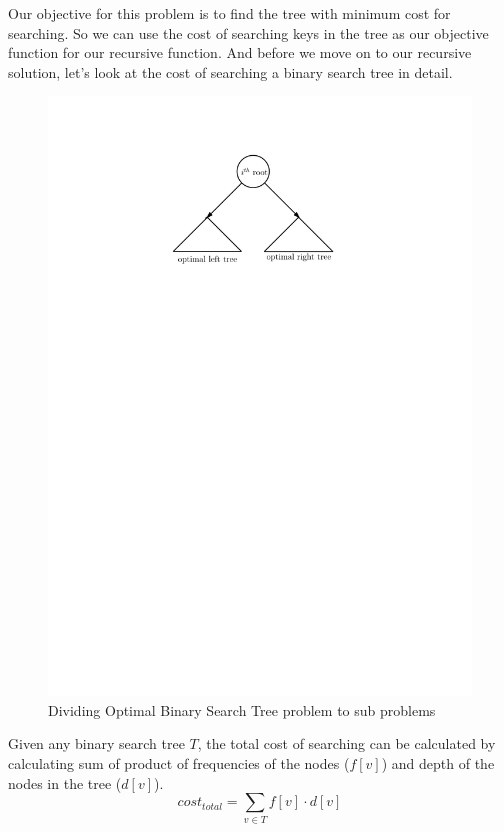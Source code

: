 \documentclass[11pt]{article}
\theoremstyle{definition}
\begin{document}
    Our objective for this problem is to find the tree with minimum cost for searching. So we can use the cost of searching keys in the tree as our objective function for our recursive function. And before we move on to our recursive solution, let's look at the cost of searching a binary search tree in detail. 
    \begin{figure}[tbh]
        \centering
        \includegraphics[scale=1]{figures/optimalBST.pdf}
        \caption{Dividing Optimal Binary Search Tree problem to sub problems}
        \label{fig:optimalBST}
    \end{figure}
    
    Given any binary search tree $T$, the total cost of searching can be calculated by calculating sum of product of frequencies of the nodes ($f[v]$) and depth of the nodes in the tree ($d[v]$).
    \begin{equation}
        cost_{total} = \sum_{v \in T} f[v]\cdot d[v]
    \end{equation}
    
\end{document}
